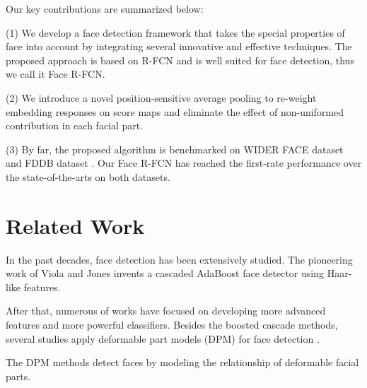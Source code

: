 \documentclass{article} %
\newcommand{\ignore}[1]{}
\begin{document}
Our key contributions are summarized below:


(1) We develop a face detection framework that takes the special properties of face into account by integrating several innovative and effective \ignore{newly developed} techniques. The proposed approach is based on R-FCN and is well suited for face detection, thus we call it Face R-FCN.

(2) We introduce a novel position-sensitive average pooling to re-weight embedding responses on score maps and eliminate the effect of non-uniformed contribution in each facial part.

(3) By far, the proposed algorithm is benchmarked on WIDER FACE dataset \cite{wider} and FDDB dataset \cite{fddb}. Our Face R-FCN has reached the first-rate performance over the state-of-the-arts on both datasets.



\section{Related Work}


In the past decades, face detection has been extensively studied.
The pioneering work of Viola and Jones \cite{vj} 
invents a cascaded AdaBoost face detector using Haar-like features.
\ignore{proposed to learn the cascaded AdaBoost classifier based on Haar-like features for face detection.}
After that, numerous of works \cite{vj1,vj2,vj3} have focused on developing more advanced features and more powerful classifiers. 
Besides the boosted cascade methods, several studies apply deformable
part models (DPM) for face detection \cite{dpmface2,dpmface3,dpmface}. 
\ignore{Besides the cascade based face detection methods, \cite{dpmface2,dpmface3,dpmface} use the deformable
part models (DPM) for face detection.} 
The DPM methods detect faces by modeling the relationship of deformable facial parts.
\ignore{define a face
with a collection of deformable parts and train a classifier to find these parts and their relationship.}
\end{document}
